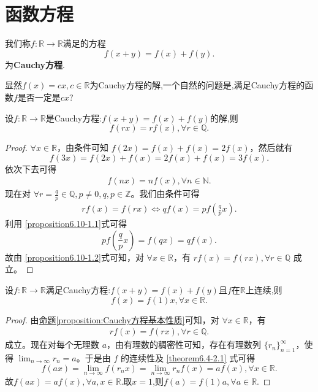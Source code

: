 \documentclass[../../main.tex]{subfiles}%
\begin{document}
\section{函数方程}

\begin{definition}
我们称\(f:\mathbb{R}\to\mathbb{R}\)满足的方程
\[
f(x + y)=f(x)+f(y).
\]
为\textbf{Cauchy方程}.
\end{definition}
\begin{note}
显然\(f(x)=cx,c\in\mathbb{R}\)为Cauchy方程的解,一个自然的问题是,满足Cauchy方程的函数\(f\)是否一定是\(cx\)?
\end{note}

\begin{proposition}[Cauchy方程基本性质]\label{proposition:Cauchy方程基本性质}
设\(f:\mathbb{R}\to\mathbb{R}\)是Cauchy方程:$f(x + y)=f(x)+f(y)$的解,则
\[
f(rx)=rf(x),\forall r\in\mathbb{Q}.
\]
\end{proposition}
\begin{proof}
\(\forall x\in \mathbb{R}\)，由条件可知 \(f(2x)=f(x)+f(x)=2f(x)\)，然后就有
\[
f(3x)=f(2x)+f(x)=2f(x)+f(x)=3f(x).
\]
依次下去可得
\begin{align}
f(nx)=nf(x),\forall n\in \mathbb{N}. \label{proposition6.10-1.1}
\end{align}
现在对 \(\forall r = \frac{q}{p}\in \mathbb{Q},p\neq 0,q,p\in \mathbb{Z}\)。我们由条件可得
\begin{align}
rf(x)=f(rx)\Leftrightarrow qf(x)=pf\left(\frac{q}{p}x\right).\label{proposition6.10-1.2}
\end{align}
利用 \eqref{proposition6.10-1.1}式可得
\[
pf\left(\frac{q}{p}x\right)=f(qx)=qf(x).
\]
故由 \eqref{proposition6.10-1.2}式可知，对 \(\forall x\in \mathbb{R}\)，有 \(rf(x)=f(rx),\forall r\in \mathbb{Q}\) 成立。
\end{proof}

\begin{theorem}\label{theorem:Cauchy方程加上连续性就能得到解是线性函数}
设\(f:\mathbb{R}\to\mathbb{R}\)满足Cauchy方程:$f(x + y)=f(x)+f(y)$且$f$在$\mathbb{R}$上连续,则
\[
f(x)=f(1)x,\forall x\in\mathbb{R}.
\]
\end{theorem}
\begin{proof}
由\hyperref[proposition:Cauchy方程基本性质]{命题\ref{proposition:Cauchy方程基本性质}}可知，对 \(\forall x\in \mathbb{R}\)，有
\begin{align}
rf(x)=f(rx),\forall r\in \mathbb{Q}. \label{theorem6.4-2.1}  
\end{align}
成立。现在对每个无理数 \(a\)，由有理数的稠密性可知，存在有理数列 \(\{r_n\}_{n = 1}^{\infty}\)，使得 \(\lim_{n\rightarrow \infty}r_n=a\)。于是由 \(f\) 的连续性及 \eqref{theorem6.4-2.1} 式可得
\[
f(ax)=\lim_{n\rightarrow \infty}f(r_nx)=\lim_{n\rightarrow \infty}r_nf(x)=af(x),\forall x\in \mathbb{R}.
\]
故$f(ax)=af(x),\forall a,x\in\mathbb{R}$.取$x=1$,则$f(a)=f(1)a,\forall a\in\mathbb{R}.$
\end{proof}
\end{document}
